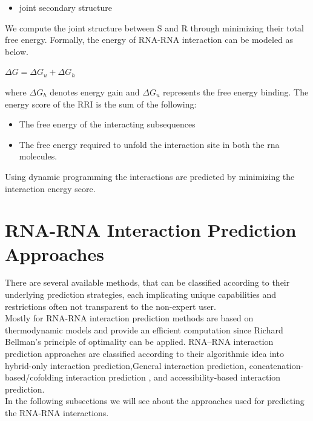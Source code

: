 \documentclass[twoside,a4paper]{report}
\begin{document}
 	\begin{itemize}
 		\item  joint secondary structure
 	\end{itemize}
 
 	We compute the joint structure between S and R through minimizing their total free energy. Formally, the energy of RNA-RNA interaction \citep{muckstein2006thermodynamics} can be modeled as below.\\
 	
 	\begin{center}
 			$\Delta G = \Delta G_u + \Delta G_h$
 	\end{center}
 
	where $ \Delta G_h$ denotes energy gain and $\Delta G_u$ represents the free energy binding. The energy score of the RRI is the sum of the following:\\
		\begin{itemize}
		\item  The free energy of the interacting subsequences
		\item  The free energy required to unfold the interaction site in both the rna molecules.
		\end{itemize}
	
	Using dynamic programming the interactions are predicted by minimizing the interaction energy score. 
	
	\section{RNA-RNA Interaction Prediction Approaches}
	There are several available methods, that can be classified according to their underlying prediction strategies, each implicating unique capabilities and restrictions often not transparent to the non-expert user.\\ 
	Mostly for RNA-RNA interaction prediction methods are based on thermodynamic models and provide an efficient computation since Richard Bellman’s principle of optimality \citep{raden2018interactive} can be applied. RNA–RNA interaction prediction approaches are classified according to their algorithmic idea into hybrid-only interaction prediction,General interaction prediction, concatenation-based/cofolding interaction prediction , and accessibility-based interaction prediction. \\
	In the following subsections we will see about the approaches used for predicting the RNA-RNA interactions.\\
\end{document}
